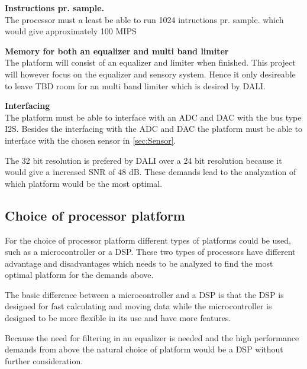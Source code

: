 \textbf{Instructions pr. sample.} \\
The processor must a least be able to run 1024 intructions pr. sample. which would give approximately 100 \gls{MIPS}


\textbf{Memory for both an equalizer and multi band limiter} \\
The platform will consist of an equalizer and limiter when finished. This project will however focus on the equalizer and sensory system. Hence it only desireable to leave TBD room for an multi band limiter which is desired by DALI. 


\textbf{Interfacing} \\
The platform must be able to interface with an ADC and DAC with the bus type \gls{I2S}. Besides the interfacing with the ADC and DAC the platform must be able to interface with the chosen sensor in \autoref{sec:Sensor}.

The 32 bit resolution is prefered by DALI over a 24 bit resolution because it would give a increased \gls{SNR} of 48 dB. These demands lead to the analyzation of which platform would be the most optimal.   

\subsection*{Choice of processor platform}
For the choice of processor platform different types of platforms could be used, such as a microcontroller or a \gls{DSP}. These two types of processors have different advantage and disadvantages which needs to be analyzed to find the most optimal platform for the demands above.

The basic difference between a microcontroller and a \gls{DSP} is that the \gls{DSP} is designed for fast calculating and moving data while the microcontroller is designed to be more flexible in its use and have more features.

Because the need for filtering in an equalizer is needed and the high performance demands from above the natural choice of platform would be a \gls{DSP} without further consideration.     




